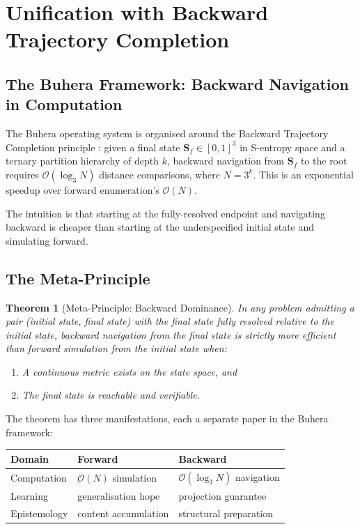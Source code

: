 \documentclass[11pt,twocolumn,a4paper]{article}
\newtheorem{theorem}{Theorem}[section]
\begin{document}
\section{Unification with Backward Trajectory Completion}
\label{sec:unification}

\subsection{The Buhera Framework: Backward Navigation in Computation}

The Buhera operating system is organised around the Backward Trajectory Completion principle \cite{sachikonye2026trajectory,sachikonye2026embedding}: given a final state $\mathbf{S}_f \in [0,1]^3$ in S-entropy space and a ternary partition hierarchy of depth $k$, backward navigation from $\mathbf{S}_f$ to the root requires $\mathcal{O}(\log_3 N)$ distance comparisons, where $N = 3^k$. This is an exponential speedup over forward enumeration's $\mathcal{O}(N)$.

The intuition is that starting at the fully-resolved endpoint and navigating backward is cheaper than starting at the underspecified initial state and simulating forward.

\subsection{The Meta-Principle}

\begin{theorem}[Meta-Principle: Backward Dominance]
\label{thm:meta}
In any problem admitting a pair (initial state, final state) with the final state fully resolved relative to the initial state, backward navigation from the final state is strictly more efficient than forward simulation from the initial state when:
\begin{enumerate}[leftmargin=*,itemsep=1pt]
\item A continuous metric exists on the state space, and
\item The final state is reachable and verifiable.
\end{enumerate}
\end{theorem}

The theorem has three manifestations, each a separate paper in the Buhera framework:

\begin{center}
\begin{tabular}{lll}
\toprule
\textbf{Domain} & \textbf{Forward} & \textbf{Backward} \\
\midrule
Computation  & $\mathcal{O}(N)$  simulation & $\mathcal{O}(\log_3 N)$ navigation \\
Learning     & generalisation hope & projection guarantee \\
Epistemology & content accumulation & structural preparation \\
\bottomrule
\end{tabular}
\end{center}
\end{document}

